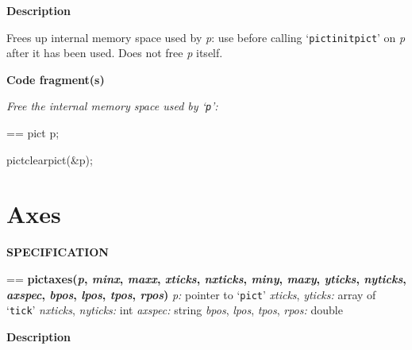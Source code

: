 \documentclass{book}
\makeatletter
\newcommand\Texinfocommandstyletextvar[1]{{\normalfont{}\textsl{#1}}}%
\newenvironment{Texinfopreformatted}{%
  \par\GNUTobeylines\obeyspaces\frenchspacing\parskip=\z@\parindent=\z@}{}
{\catcode`\^^M=13 \gdef\GNUTobeylines{\catcode`\^^M=13 \def^^M{\null\par}}}
\newenvironment{Texinfoindented}{\begin{list}{}{}\item\relax}{\end{list}}
\renewcommand{\_}{\Texinfounderscore\discretionary{}{}{}}
\makeatother
\begin{document}
\noindent{}\textbf{Description}

Frees up internal memory space used by \Texinfocommandstyletextvar{p}: use
before calling `\texttt{pict\_initpict}' on \Texinfocommandstyletextvar{p} after
it has been used.
Does not free \Texinfocommandstyletextvar{p} itself.

\noindent{}\textbf{Code fragment(s)}

\emph{Free the internal memory space used by `\texttt{p}':}
\begin{Texinfoindented}
\begin{Texinfopreformatted}%
\ttfamily pict p;

pict\_clearpict(\&p);
\end{Texinfopreformatted}
\end{Texinfoindented}

\section{{Axes}}
\label{anchor:Axes}%

\noindent{}\textbf{SPECIFICATION}
\begin{Texinfoindented}
\begin{Texinfopreformatted}%
\textbf{pict\_axes(\Texinfocommandstyletextvar{p}, \Texinfocommandstyletextvar{minx}, \Texinfocommandstyletextvar{maxx}, \Texinfocommandstyletextvar{xticks}, \Texinfocommandstyletextvar{nxticks}, \Texinfocommandstyletextvar{miny}, \Texinfocommandstyletextvar{maxy}, \Texinfocommandstyletextvar{yticks}, \Texinfocommandstyletextvar{nyticks}, \Texinfocommandstyletextvar{axspec}, \Texinfocommandstyletextvar{bpos}, \Texinfocommandstyletextvar{lpos}, \Texinfocommandstyletextvar{tpos}, \Texinfocommandstyletextvar{rpos})}
\Texinfocommandstyletextvar{p:} pointer to `\texttt{pict}'
\Texinfocommandstyletextvar{xticks}, \Texinfocommandstyletextvar{yticks:} array of `\texttt{tick}'
\Texinfocommandstyletextvar{nxticks}, \Texinfocommandstyletextvar{nyticks:} int
\Texinfocommandstyletextvar{axspec:} string
\Texinfocommandstyletextvar{bpos}, \Texinfocommandstyletextvar{lpos}, \Texinfocommandstyletextvar{tpos}, \Texinfocommandstyletextvar{rpos:} double
\end{Texinfopreformatted}
\end{Texinfoindented}
%
%

\noindent{}\textbf{Description}
\end{document}
